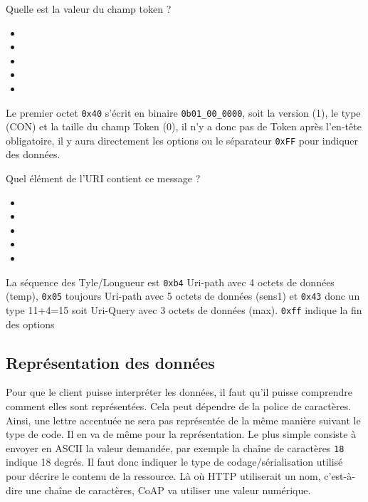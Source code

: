 {
Quelle est la valeur du champ token ?
\begin{itemize}[label=$\circ$]
   \item {}
   \item {}
   \item {}
   \item {}
   \item {}
 \end{itemize}
}
{
Le premier octet \texttt{0x40} s'écrit en binaire \texttt{0b01\_00\_0000}, soit la version (1), le type (CON) et la taille du champ Token (0), il n'y a donc pas de Token après l'en-tête obligatoire, il y aura directement les options ou le séparateur \texttt{0xFF} pour indiquer des données.}

{
Quel élément de l'URI contient ce message ?
\begin{itemize}[label=$\circ$]
   \item {}
   \item {}
   \item {}
   \item {}
     \item {}

    \end{itemize}
   }
   {
   La séquence des Tyle/Longueur est \texttt{0xb4} Uri-path avec 4 octets de données (temp), \texttt{0x05} toujours Uri-path avec 5 octets de données (sens1) et \texttt{0x43} donc un type 11+4=15 soit Uri-Query avec 3  octets de données (max). \texttt{0xff} indique la fin des options
   }
 
 \subsection{Représentation des données}

Pour que le client puisse interpréter les données, il faut qu’il puisse comprendre comment elles sont représentées. 
Cela peut dépendre de la police de caractères. Ainsi, une lettre accentuée ne sera pas représentée de la même manière suivant le type de code. Il en va de même pour la représentation. Le plus simple consiste à envoyer en ASCII la valeur demandée, par exemple la chaîne de caractères \texttt{18} indique 18 degrés. 
Il faut donc indiquer le type de codage/sérialisation utilisé pour décrire le contenu de la ressource. Là où HTTP utiliserait un nom, c'est-à-dire une chaîne de caractères, CoAP va utiliser une valeur numérique.

